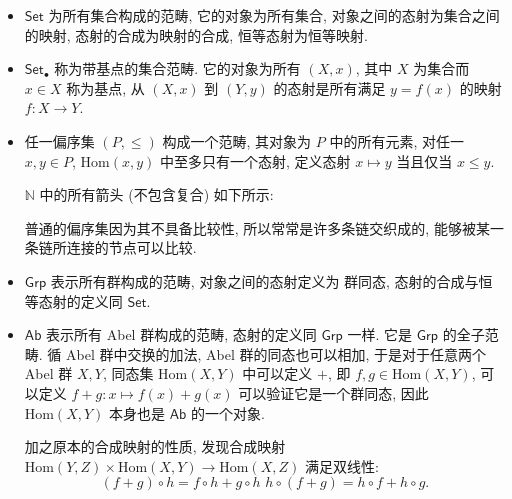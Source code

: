 \documentclass[UTF8]{book}
\begin{document}
\begin{example}
    \begin{itemize}
        \item $\mathsf{Set}$ 为所有集合构成的范畴, 
        它的对象为所有集合, 对象之间的态射为集合之间的映射, 
        态射的合成为映射的合成, 恒等态射为恒等映射. 

        \item $\mathsf{Set}_{\bullet}$ 称为带基点的集合范畴. 
        它的对象为所有 $(X,x)$, 其中 $X$ 为集合而 $x\in X$ 
        称为基点, 从 $(X,x)$ 到 $(Y,y)$ 的态射是所有满足 $y=f(x)$ 
        的映射 $f:X \to Y$. 

        \item 任一偏序集 $(P,\leq)$ 构成一个范畴, 
        其对象为 $P$ 中的所有元素, 对任一 $x,y \in P$, 
        $\mathrm{Hom}(x,y)$ 中至多只有一个态射, 
        定义态射 $x \mapsto y$ 当且仅当 $x \leq y$. 

        $\mathbb{N}$ 中的所有箭头 (不包含复合) 如下所示: 
        \begin{center}
        \end{center}
        普通的偏序集因为其不具备比较性, 所以常常是许多条链交织成的, 
        能够被某一条链所连接的节点可以比较. 

        \item $\mathsf{Grp}$ 表示所有群构成的范畴, 对象之间的态射定义为
        群同态, 态射的合成与恒等态射的定义同 $\mathsf{Set}$. 

        \item $\mathsf{Ab}$ 表示所有 Abel 群构成的范畴, 态射的定义同 
        $\mathsf{Grp}$ 一样. 它是 $\mathsf{Grp}$ 的全子范畴. 
        循 Abel 群中交换的加法, Abel 群的同态也可以相加, 
        于是对于任意两个 Abel 群 $X,Y$, 同态集 $\mathrm{Hom}(X,Y)$ 
        中可以定义 $+$, 即 $f,g \in \mathrm{Hom}(X,Y)$, 
        可以定义 $f+g:x \mapsto f(x)+g(x)$ 可以验证它是一个群同态, 
        因此 $\mathrm{Hom}(X,Y)$ 本身也是 $\mathsf{Ab}$ 的一个对象. 

        加之原本的合成映射的性质, 发现合成映射 
        $\mathrm{Hom}(Y,Z) \times \mathrm{Hom}(X,Y)\to \mathrm{Hom}(X,Z)$ 
        满足双线性: 
        $$ (f+g)\circ h = f \circ h + g \circ h \,\,
        h\circ (f+g) = h \circ f + h \circ g.$$ 


\end{itemize}
\end{example}
\end{document}

